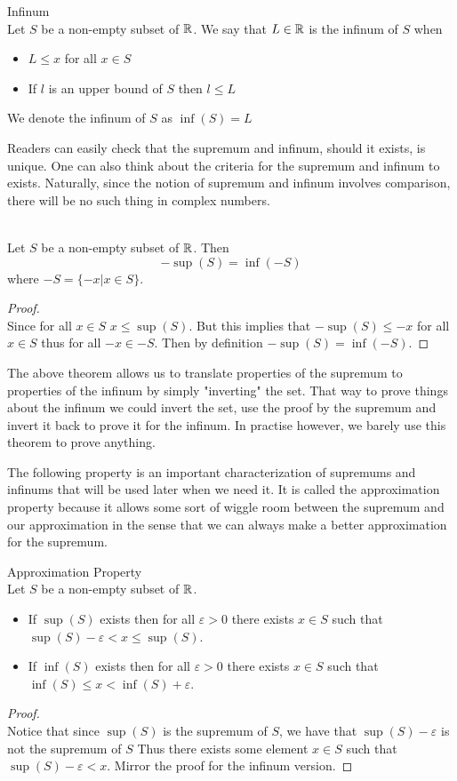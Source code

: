 \documentclass[a4paper]{article}
\begin{document}
\begin{defn}{Infinum}{}\\ Let $S$ be a non-empty subset of $\mathbb{R}$. We say that $L\in\mathbb{R}$ is the infinum of $S$ when
\begin{itemize}
\item $L\leq x$ for all $x\in S$
\item If $l$ is an upper bound of $S$ then $l\leq L$
\end{itemize}
We denote the infinum of $S$ as $\inf(S)=L$
\end{defn}

Readers can easily check that the supremum and infinum, should it exists, is unique. One can also think about the criteria for the supremum and infinum to exists. Naturally, since the notion of supremum and infinum involves comparison, there will be no such thing in complex numbers. 

\begin{prp}{}{}\\ Let $S$ be a non-empty subset of $\mathbb{R}$. Then $$-\sup(S)=\inf(-S)$$ where $-S=\{-x|x\in S\}$. 
\begin{proof}\\ Since for all $x\in S$ $x\leq\sup(S)$. But this implies that $-\sup(S)\leq-x$ for all $x\in S$ thus for all $-x\in-S$. Then by definition $-\sup(S)=\inf(-S)$. 
\end{proof}
\end{prp}

The above theorem allows us to translate properties of the supremum to properties of the infinum by simply "inverting" the set. That way to prove things about the infinum we could invert the set, use the proof by the supremum and invert it back to prove it for the infinum. In practise however, we barely use this theorem to prove anything. 

The following property is an important characterization of supremums and infinums that will be used later when we need it. It is called the approximation property because it allows some sort of wiggle room between the supremum and our approximation in the sense that we can always make a better approximation for the supremum. 

\begin{prp}{Approximation Property}{}\\ Let $S$ be a non-empty subset of $\mathbb{R}$. 
\begin{itemize}
\item If $\sup(S)$ exists then for all $\varepsilon>0$ there exists $x\in S$ such that $\sup(S)-\varepsilon<x\leq\sup(S)$. 
\item If $\inf(S)$ exists then for all $\varepsilon>0$ there exists $x\in S$ such that $\inf(S)\leq x<\inf(S)+\varepsilon$. 
\end{itemize}
\begin{proof}\\ Notice that since $\sup(S)$ is the supremum of $S$, we have that $\sup(S)-\varepsilon$ is not the supremum of $S$ Thus there exists some element $x\in S$ such that $\sup(S)-\varepsilon<x$. Mirror the proof for the infinum version. 
\end{proof}
\end{prp}
\end{document}
